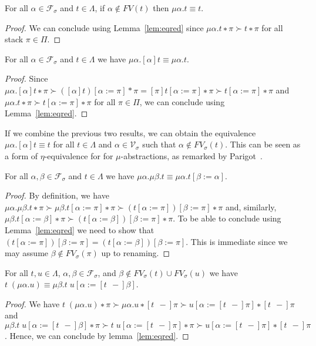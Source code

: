 \begin{theorem}
  For all $α ∈ \mathcal{F}_{σ}$ and $t ∈ Λ$, if $α ∉ FV(t)$ then $μα.t ≡ t$.
\end{theorem}
\begin{proof}
  We can conclude using Lemma~\ref{lem:eqred} since ${μα.t ∗ π} ≻ {t ∗ π}$ for
  all stack $π ∈ Π$.
\end{proof}

\begin{theorem}
  For all $α ∈ \mathcal{F}_σ$ and $t ∈ Λ$ we have $μα.[α]t ≡ μα.t$.
\end{theorem}
\begin{proof}
  Since ${μα.[α]t ∗ π} ≻ {([α]t)[α:=π] * π} = {[π]t[α := π] ∗ π} ≻
  {t[α := π] ∗ π}$ and ${μα.t ∗ π} ≻ {t[α := π] ∗ π}$ for all $π ∈ Π$, we
  can conclude using Lemma~\ref{lem:eqred}.
\end{proof}

\begin{remark}
  If we combine the previous two results, we can obtain the equivalence
  $μα.[α]t ≡ t$ for all $t ∈ Λ$ and $α ∈ \mathcal{V}_{σ}$ such that $α ∉
  FV_{σ}(t)$. This can be seen as a form of $η$-equivalence for
  for $μ$-abstractions, as remarked by Parigot~\cite{Parigot1992}.
\end{remark}

\begin{theorem}
  For all $α, β ∈ \mathcal{F}_{σ}$ and $t ∈ Λ$ we have $μα.μβ.t ≡ μα.t[β := α]$.
\end{theorem}
\begin{proof}
  By definition, we have ${μα.μβ.t ∗ π} ≻ {μβ.t[α := π] ∗ π} ≻
  {(t[α := π])[β := π] ∗ π}$ and, similarly, ${μβ.t[α := β] ∗ π} ≻
  {(t[α := β])[β := π] ∗ π}$. To be able to conclude using
  Lemma~\ref{lem:eqred} we need to show that
  ${(t[α := π])[β := π]} = {(t[α := β])[β := π]}$. This is immediate since
  we may assume $β ∉ FV_{σ}(π)$ up to renaming.
\end{proof}

\begin{theorem}
  For all $t, u ∈ Λ$, $α, β ∈ \mathcal{F}_{σ}$, and $β \notin FV_σ(t) ∪
  FV_σ(u)$ we have $t\;(μα.u) ≡ μβ.t\;u[α := [t\;\,{-}]β]$.
\end{theorem}
\begin{proof}
  We have ${t\;(μα.u) ∗ π} ≻ {μα.u ∗ [t \;\,{-}]π} ≻ {u[α := [t \;\,{-}]\pi] ∗
  [t \;\,{-}]\pi}$ and ${μβ.t\;u[α := [t\;\,{-}]β] ∗ π} ≻  {t\;u[α :=
  [t\;\,{-}]\pi] ∗ π} ≻ {u[α := [t\;\,{-}]\pi]∗ [t\;\,{-}] π}$. Hence, we can
  conclude by lemma~\ref{lem:eqred}.
\end{proof}


